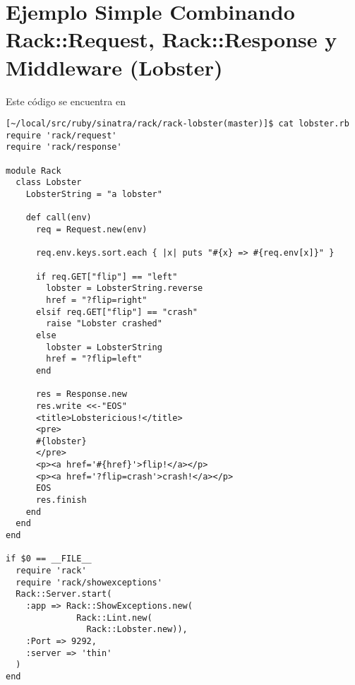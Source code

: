 \section{Ejemplo Simple Combinando Rack::Request, Rack::Response y Middleware (Lobster)}

Este código se encuentra en

\begin{verbatim}
[~/local/src/ruby/sinatra/rack/rack-lobster(master)]$ cat lobster.rb 
require 'rack/request'
require 'rack/response'

module Rack
  class Lobster
    LobsterString = "a lobster"

    def call(env)
      req = Request.new(env)

      req.env.keys.sort.each { |x| puts "#{x} => #{req.env[x]}" }

      if req.GET["flip"] == "left"
        lobster = LobsterString.reverse
        href = "?flip=right"
      elsif req.GET["flip"] == "crash"
        raise "Lobster crashed"
      else
        lobster = LobsterString
        href = "?flip=left"
      end

      res = Response.new
      res.write <<-"EOS"
      <title>Lobstericious!</title>
      <pre>
      #{lobster}
      </pre>
      <p><a href='#{href}'>flip!</a></p>
      <p><a href='?flip=crash'>crash!</a></p>
      EOS
      res.finish
    end
  end
end

if $0 == __FILE__
  require 'rack'
  require 'rack/showexceptions'
  Rack::Server.start(
    :app => Rack::ShowExceptions.new(
              Rack::Lint.new(
                Rack::Lobster.new)), 
    :Port => 9292,
    :server => 'thin'
  )
end
\end{verbatim}

